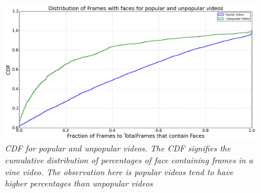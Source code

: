 \begin{figure}[!htb]
\centering
\includegraphics[width=\columnwidth]{plots/FaceCDF}
\caption{\textsl{ CDF for popular and unpopular videos. The CDF signifies the cumulative distribution of percentages of face containing frames in a vine video. The observation here is popular videos tend to have higher percentages than unpopular videos}}
\label{fig:CDF_posts}
\end{figure}

